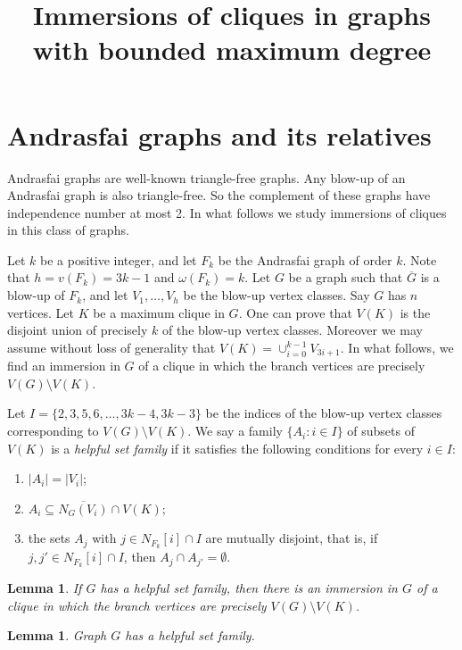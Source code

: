 \documentclass[a4paper,12pt]{article}
\title{Immersions of cliques in graphs \\ with bounded maximum degree}
\newtheorem{lemma}[theorem]{Lemma}
\begin{document}
\maketitle

\section{Andrasfai graphs and its relatives}

Andrasfai graphs are well-known triangle-free graphs. 
Any blow-up of an Andrasfai graph is also triangle-free.
So the complement of these graphs have independence number at most 2. 
In what follows we study immersions of cliques in this class of graphs. 
 
Let \(k\) be a positive integer, and let \(F_k\) be the Andrasfai graph of order $k$.
Note that \(h = v(F_k) = 3k-1\) and \(\omega(F_k) = k\).
Let \(G\) be a graph such that \(\overline{G}\) is a blow-up of \(F_k\), 
and let \(V_1,\ldots, V_h\) be the blow-up vertex classes.
Say \(G\) has \(n\) vertices.
Let \(K\) be a maximum clique in \(G\).
One can prove that \(V(K)\) is the disjoint union of precisely \(k\) of the blow-up vertex classes.
Moreover we may assume without loss of generality that \(V(K) = \cup_{i=0}^{k-1} V_{3i+1}\).
In what follows, we find an immersion in \(G\) of a clique in which the branch vertices are 
precisely \(V(G)\setminus V(K)\).

Let \(I = \{2,3,5,6,\ldots,3k-4,3k-3\}\) be the indices of the blow-up vertex classes
corresponding to \(V(G)\setminus V(K)\).
We say a family \(\{A_i: i \in I\}\) of subsets of \(V(K)\) is a \emph{helpful set family} 
if it satisfies the following conditions for every \(i \in I\):
\begin{enumerate}
\item \(|A_i| = |V_i|\);
\item \(A_i \subseteq \overline{N_G(V_i)} \cap V(K)\);
\item the sets \(A_j\) with \(j \in N_{F_k}[i]\cap I\) are mutually disjoint, 
  that is, if \(j,j' \in N_{F_k}[i] \cap I\), then \(A_j\cap A_{j'} = \emptyset\).
\end{enumerate}

\begin{lemma}
  If \(G\) has a helpful set family, then there is an immersion in \(G\) of 
  a clique in which the branch vertices are precisely \(V(G)\setminus V(K)\).
\end{lemma}

\begin{lemma}
  Graph \(G\) has a helpful set family. 
\end{lemma}
\end{document}
